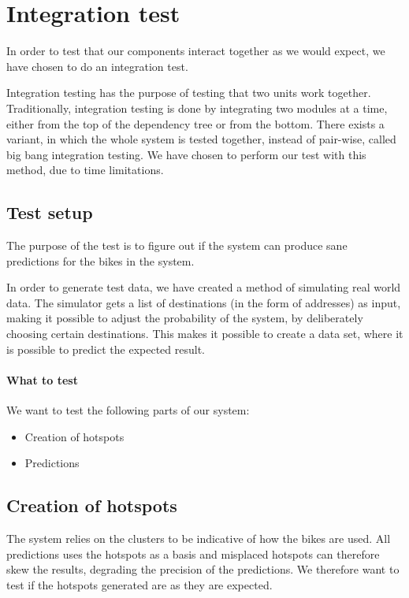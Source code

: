\section{Integration test}

In order to test that our components interact together as we would expect, we have chosen to do an integration test.

Integration testing has the purpose of testing that two units work together. 
Traditionally, integration testing is done by integrating two modules at a time, either from the top of the dependency tree or from the bottom.
There exists a variant, in which the whole system is tested together, instead of pair-wise, called big bang integration testing.
We have chosen to perform our test with this method, due to time limitations. \cite{inttest}

\subsection{Test setup}
The purpose of the test is to figure out if the system can produce sane predictions for the bikes in the system.


In order to generate test data, we have created a method of simulating real world data. 
The simulator gets a list of destinations (in the form of addresses) as input, making it possible to adjust the probability of the system, by deliberately choosing certain destinations.
This makes it possible to create a data set, where it is possible to predict the expected result.

\paragraph{What to test}
We want to test the following parts of our system:

\begin{itemize}
\item Creation of hotspots
\item Predictions
\end{itemize}

\subsection{Creation of hotspots}
The system relies on the clusters to be indicative of how the bikes are used. 
All predictions uses the hotspots as a basis and misplaced hotspots can therefore skew the results, degrading the precision of the predictions.
We therefore want to test if the hotspots generated are as they are expected.

